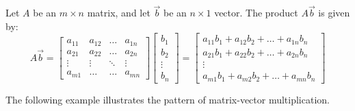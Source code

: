\documentclass{ximera}
\begin{document}
\begin{definition}\label{def:matrixvectormult}
Let $A$ be an $m\times n$ matrix, and let $\vec{b}$ be an $n\times 1$ vector.  The product $A\vec{b}$ is given by:
$$A\vec{b}=\begin{bmatrix}
           a_{11} & a_{12}&\dots&a_{1n}\\
           a_{21}&a_{22} &\dots &a_{2n}\\
		\vdots & \vdots&\ddots &\vdots\\
		a_{m1}&\dots &\dots &a_{mn}
         \end{bmatrix}\begin{bmatrix}b_1\\b_2\\\vdots\\b_n\end{bmatrix}=\begin{bmatrix}a_{11}b_1+a_{12}b_2+\ldots +a_{1n}b_n\\a_{21}b_1+a_{22}b_2+\ldots +a_{2n}b_n\\\vdots\\a_{m1}b_1+a_{m2}b_2+\ldots +a_{mn}b_n\end{bmatrix}$$
\end{definition}
The following example illustrates the pattern of matrix-vector multiplication.
\end{document}
